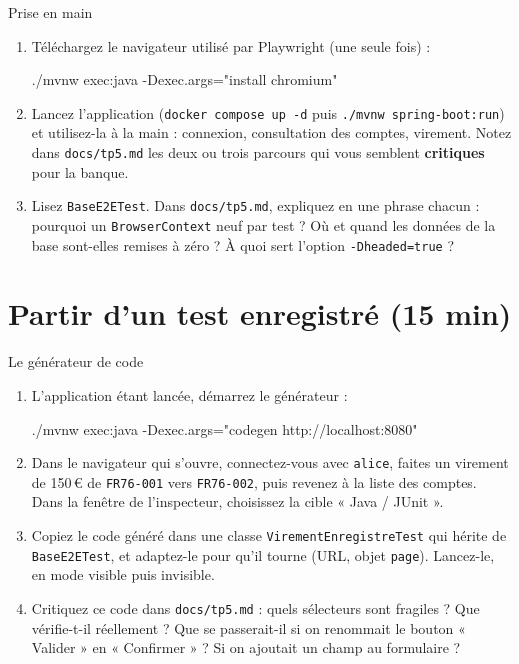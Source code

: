 \documentclass[11pt]{article}
\begin{document}
\begin{exobox}{Prise en main}
\begin{enumerate}[leftmargin=1.4em]
  \item Téléchargez le navigateur utilisé par Playwright (une seule fois) :
\begin{codebox}
./mvnw exec:java -Dexec.args="install chromium"
\end{codebox}
  \item Lancez l'application (\texttt{docker compose up -d} puis \texttt{./mvnw spring-boot:run}) et utilisez-la à la main : connexion, consultation des comptes, virement. Notez dans \texttt{docs/tp5.md} les deux ou trois parcours qui vous semblent \textbf{critiques} pour la banque.
  \item Lisez \texttt{BaseE2ETest}. Dans \texttt{docs/tp5.md}, expliquez en une phrase chacun : pourquoi un \texttt{BrowserContext} neuf par test ? Où et quand les données de la base sont-elles remises à zéro ? À quoi sert l'option \texttt{-Dheaded=true} ?
\end{enumerate}
\end{exobox}

\section{Partir d'un test enregistré (15 min)}

\begin{exobox}{Le générateur de code}
\begin{enumerate}[leftmargin=1.4em]
  \item L'application étant lancée, démarrez le générateur :
\begin{codebox}
./mvnw exec:java -Dexec.args="codegen http://localhost:8080"
\end{codebox}
  \item Dans le navigateur qui s'ouvre, connectez-vous avec \texttt{alice}, faites un virement de 150\,\euro{} de \texttt{FR76-001} vers \texttt{FR76-002}, puis revenez à la liste des comptes. Dans la fenêtre de l'inspecteur, choisissez la cible « Java / JUnit ».
  \item Copiez le code généré dans une classe \texttt{VirementEnregistreTest} qui hérite de \texttt{BaseE2ETest}, et adaptez-le pour qu'il tourne (URL, objet \texttt{page}). Lancez-le, en mode visible puis invisible.
  \item Critiquez ce code dans \texttt{docs/tp5.md} : quels sélecteurs sont fragiles ? Que vérifie-t-il réellement ? Que se passerait-il si on renommait le bouton « Valider » en « Confirmer » ? Si on ajoutait un champ au formulaire ?
\end{enumerate}
\end{exobox}
\end{document}
